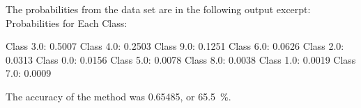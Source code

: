 The probabilities from the data set are in the following output excerpt:
Probabilities for Each Class:

Class 3.0: 0.5007
Class 4.0: 0.2503
Class 9.0: 0.1251
Class 6.0: 0.0626
Class 2.0: 0.0313
Class 0.0: 0.0156
Class 5.0: 0.0078
Class 8.0: 0.0038
Class 1.0: 0.0019
Class 7.0: 0.0009


The accuracy of the method was 0.65485, or 65.5~\%.

